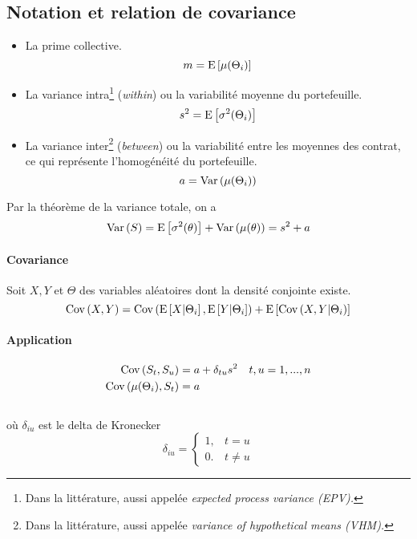 \documentclass[10pt, french]{article}
\begin{document}
\begin{multicols*}{3}
\subsection*{Notation et relation de covariance}
\begin{itemize}
    \item La prime collective. \[ m = \mathrm{E} \left[ \mu(\Theta_i) \right] \]
    \item La variance intra\footnote{Dans la littérature, aussi appelée \emph{expected process variance (EPV).}}  (\emph{within}) ou la variabilité moyenne du portefeuille.\[ s^2 = \mathrm{E} \left[ \sigma^2(\Theta_i) \right] \]
    \item La variance inter\footnote{Dans la littérature, aussi appelée \emph{variance of hypothetical means (VHM).}}  (\emph{between}) ou la variabilité entre les moyennes des contrat, ce qui représente l'homogénéité du portefeuille. \[ a = \mathrm{Var} \left( \mu(\Theta_i) \right) \]
\end{itemize}

Par la théorème de la variance totale, on a
\[\mathrm{Var} \left( S \right) = \mathrm{E} \left[ \sigma^2(\theta) \right] + \mathrm{Var} \left( \mu(\theta) \right) = s^2  +a \]


\paragraph*{Covariance}
Soit $X,Y$ et $\Theta$ des variables aléatoires dont la densité conjointe existe. \[ \mathrm{Cov} \left( X,Y \right) = \mathrm{Cov} \left( \mathrm{E} \left[ X|\Theta_i \right], \mathrm{E} \left[ Y|\Theta_i \right] \right) + \mathrm{E} \left[ \mathrm{Cov} \left( X,Y|\Theta_i \right) \right] \]

\paragraph*{Application}
\begin{align*}
    \mathrm{Cov} \left( S_t,S_u \right) &= a + \delta_{tu}s^2\quad t,u = 1,...,n  \\
    \mathrm{Cov} \left( \mu(\Theta_i),S_t \right) &= a
\end{align*} \\
où $\delta_{iu}$ est le delta de Kronecker
\[
\delta_{iu} =
\left\{
\begin{array}{lc}
    1, & t = u \\
    0. & t \neq u
\end{array}
\right.
\]


\end{multicols*}
\end{document}
